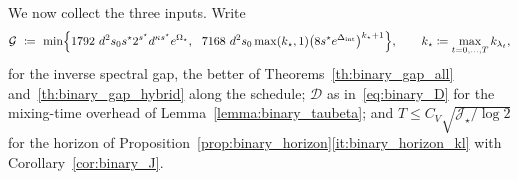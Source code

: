 \documentclass[aos]{imsart}%
\theoremstyle{plain}
\theoremstyle{definition}
\begin{document}
    We now collect the three inputs. Write
    \begin{equation}
        \label{eq:binary_G}
        \mathcal{G}\ \coloneq\ \min\Bigl\{
        1792\ d^{2}s_0s^{\star}2^{s^{\star}}d^{\kappa s^{\star}}
        e^{\Omega_\star},\ \
        7168\ d^{2}s_0\max(k_\star,1)
        \bigl(8s^{\star}e^{\Delta_{\mathrm{int}}}\bigr)^{k_\star+1}\Bigr\},
        \qquad
        k_\star\coloneq\max_{t=0,\dots,T}k_{\lambda_t},
    \end{equation}
    for the inverse spectral gap, the better of
    Theorems~\ref{th:binary_gap_all} and~\ref{th:binary_gap_hybrid} along the
    schedule; $\mathcal D$ as in~\eqref{eq:binary_D} for the mixing-time
    overhead of Lemma~\ref{lemma:binary_taubeta}; and
    $T\leq C_V\sqrt{\mathcal{J}_\star/\log2}$ for the horizon of
    Proposition~\ref{prop:binary_horizon}\ref{it:binary_horizon_kl} with
    Corollary~\ref{cor:binary_J}.
\end{document}
